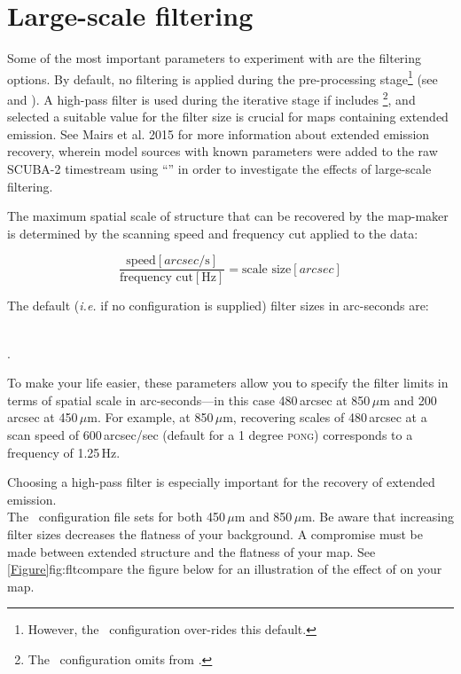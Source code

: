 \section{Large-scale filtering}
\label{sec:filt}

Some of the most important parameters to experiment with are the
filtering options. By default, no filtering is applied during the
pre-processing stage\footnote{However, the \blankfield\ configuration
over-rides this default.} (see 
and ). A high-pass
filter is used during the iterative stage if 
includes \footnote{The \blankfield\ configuration omits
 from .}, and selected a suitable value
for the filter size is crucial for maps containing extended emission. See
Mairs et al. 2015 \cite{extendedrecovery} for more information about 
extended emission recovery, wherein model sources with known parameters
were added to the raw SCUBA-2 timestream using 
``'' in order to investigate the effects of large-scale filtering.

The maximum spatial scale of structure that can be recovered by the
map-maker is determined by the scanning speed and frequency cut
applied to the data:

\begin{equation}
\frac{\textrm{speed}[arcsec / \textrm{s}]}{\textrm{frequency
    cut}[\textrm{Hz}]}=\textrm{scale size}[arcsec]
\end{equation}

The default (\emph{i.e.} if no configuration is supplied) filter sizes
in arc-seconds are:

 \\
.

To make your life easier, these parameters allow you to specify the
filter limits in terms of spatial scale in arc-seconds---in this case
480\,arcsec at 850\,$\mu$m and 200\,arcsec at 450\,$\mu$m. For example,
at 850\,$\mu$m, recovering scales of 480\,arcsec at a scan speed of
600\,arcsec/sec (default for a 1 degree \textsc{pong}) corresponds to
a frequency of 1.25\,Hz.

Choosing a high-pass filter is especially important for the recovery
of extended emission.\\ The \brightextended\ configuration file sets
for both 450\,$\mu$m and 850\,$\mu$m. Be aware that increasing filter sizes
decreases the flatness of your background. A compromise must be made between
extended structure and the flatness of your map. See \cref{Figure}{fig:fltcompare}
{the figure below} for an illustration of the effect of
 on your map.

